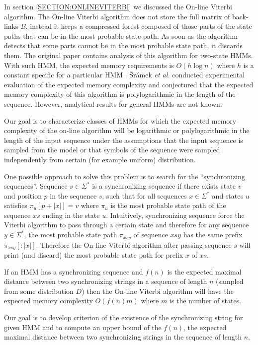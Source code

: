 In section \ref{SECTION:ONLINEVITERBI} we discussed the  On-line Viterbi
algorithm. The On-line Viterbi algorithm does not store the full matrix of back-links
$B$, instead it keeps a compressed forest
composed of those parts of the state paths that can be in the most
probable state path. As soon as the algorithm detects that some parts cannot be
in the most probable state path, it discards them. The original paper
contains analysis of this algorithm for two-state HMMs. With such
HMM, the expected memory requirements is $O(h\log n)$ where $h$ is a constant
specific for a particular HMM \cite{Sramek2007}. Šrámek {\it et al.} conducted experimental
evaluation of the expected memory complexity and conjectured that the expected
memory complexity of this algorithm is polylogarithmic in the length of the
sequence. However, analytical results for general HMMs are not known.

Our goal is to characterize classes of HMMs for which  the expected memory
complexity of the on-line algorithm will be logarithmic or polylogarithmic in
the length of the input sequence under the assumptions that the input sequence is
sampled from the model or that symbols of the sequence were sampled
independently from certain (for example uniform) distribution.

One possible approach to solve this problem is to search for the ``synchronizing
sequences''.  
Sequence $s\in\Sigma^*$ is a synchronizing sequence if there exists
state $v$ and position $p$ in the sequence $s$, such that for all sequences
$x\in \Sigma^*$ and states $u$ satisfies $\pi_u[{p+|x|}]=v$ where $\pi_u$ is the
most probable state path of the sequence $xs$ ending
in the state $u$. Intuitively, synchronizing sequence force the Viterbi algorithm
to pass through a certain state and therefore for any sequence $y\in \Sigma^*$,
the most probable state path $\pi_{xsy}$ of sequence $xsy$ has the same prefix
$\pi_{xsy}[:|x|]$. Therefore the On-line Viterbi algorithm after passing
sequence $s$ will print (and discard) the most probable state path for prefix
$x$ of $xs$. 

If an HMM has a synchronizing sequence and $f(n)$ is the expected maximal distance
between two synchronizing strings in a sequence of length $n$ (sampled from
some distribution $D$) then the On-line Viterbi algorithm will have the expected memory
complexity $O(f(n)m)$ where $m$ is the number of states.

Our goal is to develop criterion of the existence of the synchronizing string
for given HMM and to compute an upper bound of the $f(n)$, the expected maximal
distance between two synchronizing strings in the sequence of length $n$.


